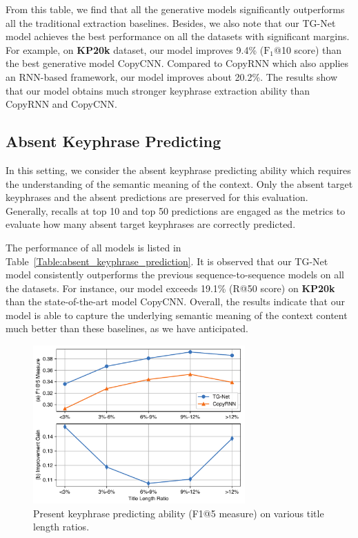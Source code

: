 \documentclass[letterpaper]{article} %
\begin{document}
From this table, we find that all the generative models significantly outperforms all the traditional extraction baselines. Besides, we also note that our TG-Net model achieves the best performance on all the datasets with significant margins. For example, on \textbf{KP20k} dataset, our model improves 9.4\% ($\text{F}_1$@10 score) than the best generative model CopyCNN. Compared to CopyRNN which also applies an RNN-based framework, our model improves about 20.2\%. The results show that our model obtains much stronger keyphrase extraction ability than CopyRNN and CopyCNN.

\subsection{Absent Keyphrase Predicting}
In this setting, we consider the absent keyphrase predicting ability which requires the understanding of the semantic meaning of the context. Only the absent target keyphrases and the absent predictions are preserved for this evaluation. Generally, recalls at top 10 and top 50 predictions are engaged as the metrics to evaluate how many absent target keyphrases are correctly predicted.

The performance of all models is listed in Table~\ref{Table:absent_keyphrase_prediction}. It is observed that our TG-Net model consistently outperforms the previous sequence-to-sequence models on all the datasets. For instance, our model exceeds 19.1\% (R@50 score) on \textbf{KP20k} than the state-of-the-art model CopyCNN. Overall, the results indicate that our model is able to capture the underlying semantic meaning of the context content much better than these baselines, as we have anticipated.

\begin{figure}[t]
\centering
\includegraphics[width=3.2in]{figures/PaperID3210_TGNet_title_len_ratios_cmyk.pdf}
\caption{Present keyphrase predicting ability (F1@5 measure) on various title length ratios.}
\label{figure:title_lens_present_cureve}
\end{figure}
\end{document}
